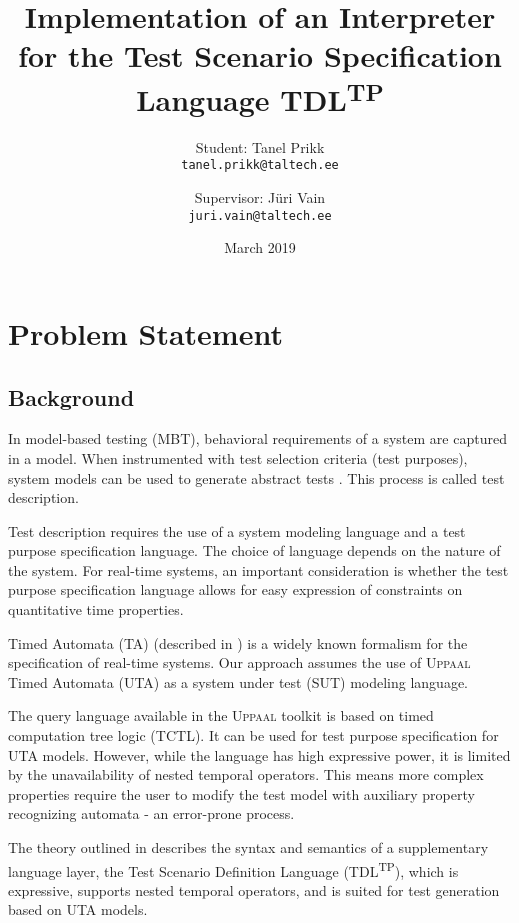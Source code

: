 \documentclass[12pt,oneside,a4paper,notitlepage]{article}
\title{
	Implementation of an Interpreter
	for the Test Scenario Specification Language TDL\textsuperscript{TP}\\
}
\author{
	Student: Tanel Prikk\\
	\texttt{tanel.prikk@taltech.ee}
	\and
	Supervisor: Jüri Vain\\
	\texttt{juri.vain@taltech.ee}
}
\date{March 2019}
\begin{document}
	\maketitle

	\section*{Problem Statement}
	\subsection*{Background}
	\par In model-based testing (MBT), behavioral requirements of a system are captured in a model. When instrumented with test selection criteria (test purposes),  system models can be used to generate abstract tests \cite{etsimbt}. This process is called test description.

	\bigskip

	\par Test description requires the use of a system modeling language and a test purpose specification language. The choice of language depends on the nature of the system. For real-time systems, an important consideration is whether the test purpose specification language allows for easy expression of constraints on quantitative time properties.

	\bigskip

	\par Timed Automata (TA) (described in \cite{mcprinciples}) is a widely known formalism for the specification of real-time systems. Our approach assumes the use of \textsc{Uppaal} Timed Automata (UTA) \cite{uppaaltoolkit} as a system under test (SUT) modeling language.

	\bigskip

	\par The query language available in the \textsc{Uppaal} toolkit is based on timed computation tree logic (TCTL). It can be used for test purpose specification for UTA models. However, while the language has high expressive power, it is limited by the unavailability of nested temporal operators. This means more complex properties require the user to modify the test model with auxiliary property recognizing automata - an error-prone process.

	\bigskip

	\par The theory outlined in \cite{tdlarticle} describes the syntax and semantics of a supplementary language layer, the Test Scenario Definition Language (TDL\textsuperscript{TP}), which is expressive, supports nested temporal operators, and is suited for test generation based on UTA models.
\end{document}
